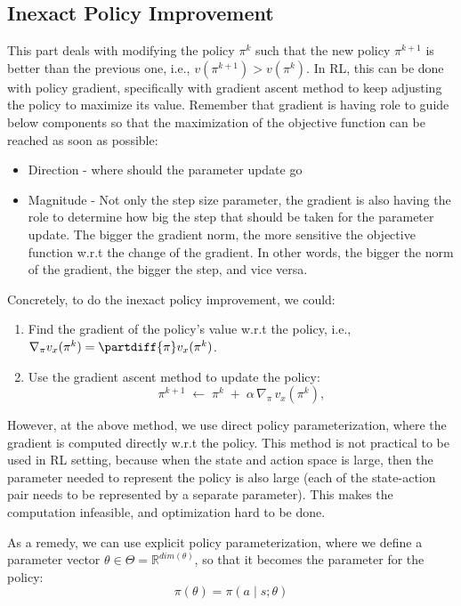 \subsection{Inexact Policy Improvement}
This part deals with modifying the policy $\pi^k$ such that the new policy $\pi^{k+1}$ is better than the previous one, i.e., $v(\pi^{k+1}) > v(\pi^{k})$.
In RL, this can be done with policy gradient, specifically with gradient ascent method to keep adjusting the policy to maximize its value.
Remember that gradient is having role to guide below components so that the maximization of the objective function can be reached as soon as possible:
\begin{itemize}
    \item Direction - where should the parameter update go
    \item Magnitude - Not only the step size parameter, the gradient is also having the role to determine how big the step that should be taken for the parameter update. The bigger the gradient norm, the more sensitive the objective function w.r.t the change of the gradient. In other words, the bigger the norm of the gradient, the bigger the step, and vice versa.
\end{itemize}

Concretely, to do the inexact policy improvement, we could:
\begin{enumerate}[label=\alph*]
    \item  Find the gradient of the policy's value w.r.t the policy, i.e., $\nabla_\pi v_x(\pi^k) = \partdiff{\pi} v_x(\pi^k)$. 
    \item Use the gradient ascent method to update the policy:
    \begin{equation}
        \pi^{k+1} \;\leftarrow\; \pi^k \;+\; \alpha \,\nabla_\pi \,v_x(\pi^k),
    \end{equation}
\end{enumerate}

However, at the above method, we use direct policy parameterization, where the gradient is computed directly w.r.t the policy. 
This method is not practical to be used in RL setting, because when the state and action space is large, then the parameter needed to represent the policy is also large (each of the state-action pair needs to be represented by a separate parameter). This makes the computation infeasible, and optimization hard to be done.

As a remedy, we can use explicit policy parameterization, where we define a parameter vector $\theta \in \Theta = \mathbb{R}^{dim(\theta)}$, so that it becomes the parameter for the policy:
\begin{equation}
    \pi(\theta) = \pi(a \mid s; \theta)
\end{equation}  

